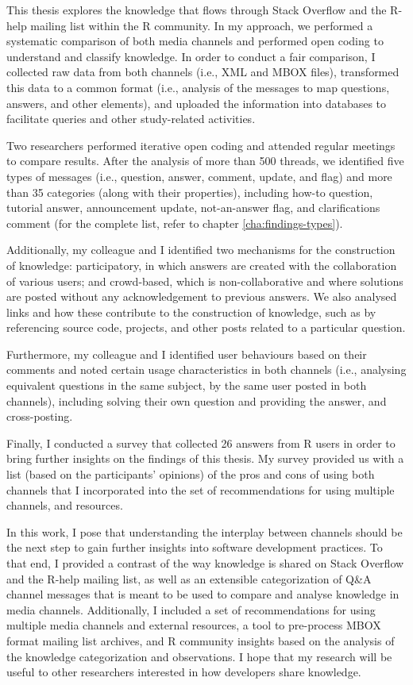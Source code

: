 \documentclass{sig-alternate-05-2015}
\begin{document}
	This thesis explores the knowledge that flows through Stack Overflow and the R-help mailing list within the R community.
	In my approach, we performed a systematic comparison of both media channels and performed open coding to understand and classify knowledge.
	In order to conduct a fair comparison, I collected raw data from both channels (i.e., XML and MBOX files), transformed this data to a common format (i.e., analysis of the messages to map questions, answers, and other elements), and uploaded the information into databases to facilitate queries and other study-related activities.

	Two researchers performed iterative open coding and attended regular meetings to compare results.
	After the analysis of more than 500 threads, we identified five types of messages (i.e., question, answer, comment, update, and flag) and more than 35 categories (along with their properties), including how-to question, tutorial answer, announcement update, not-an-answer flag, and clarifications comment (for the complete list, refer to chapter \ref{cha:findings-types}).

	Additionally, my colleague and I identified two mechanisms for the construction of knowledge: participatory, in which answers are created with the collaboration of various users; and crowd-based, which is non-collaborative and where solutions are posted without any acknowledgement to previous answers.
	We also analysed links and how these contribute to the construction of knowledge, such as by referencing source code, projects, and other posts related to a particular question.

	Furthermore, my colleague and I identified user behaviours based on their comments and noted certain usage characteristics in both channels (i.e., analysing equivalent questions in the same subject, by the same user posted in both channels), including solving their own question and providing the answer, and cross-posting.

	Finally, I conducted a survey that collected 26 answers from R users in order to bring further insights on the findings of this thesis. 
	My survey provided us with a list (based on the participants' opinions) of the pros and cons of using both channels that I incorporated into the set of recommendations for using multiple channels, and resources.

	In this work, I pose that understanding the interplay between channels should be the next step to gain further insights into software development practices.
	To that end, I provided a contrast of the way knowledge is shared on Stack Overflow and the R-help mailing list, as well as an extensible categorization of Q\&A channel messages that is meant to be used to compare and analyse knowledge in media channels.
	Additionally, I included a set of recommendations for using multiple media channels and external resources, a tool to pre-process MBOX format mailing list archives, and R community insights based on the analysis of the knowledge categorization and observations.
	I hope that my research will be useful to other researchers interested in how developers share knowledge.




\end{document}
